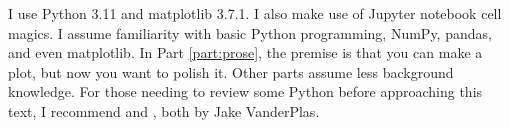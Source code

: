 I use Python 3.11 and matplotlib 3.7.1. I also make use of Jupyter notebook cell magics. I assume familiarity with basic Python programming, NumPy, pandas, and even matplotlib. In Part \ref{part:prose}, the premise is that you can make a plot, but now you want to polish it. Other parts assume less background knowledge. For those needing to review some Python before approaching this text, I recommend  and , both by Jake VanderPlas.

